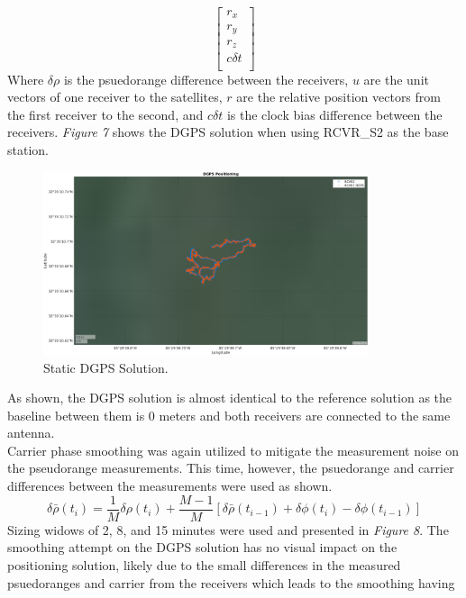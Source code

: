 \documentclass[11pt]{article}
\begin{document}
\begin{enumerate}[label=\textbf{\arabic*.}]
\begin{equation}
\begin{bmatrix}
        r_x \\ r_y \\ r_z \\ c \delta t \\
      \end{bmatrix}
    \end{equation}
    Where $\delta\rho$ is the psuedorange difference between the receivers, $u$ are 
    the unit vectors of one receiver to the satellites, $r$ are the relative position 
    vectors from the first receiver to the second, and $c \delta t$ is the clock bias 
    difference between the receivers. \emph{Figure 7} shows the DGPS solution when using 
    RCVR\_S2 as the base station.
    \begin{figure}[H]
      \centering
      \includegraphics[width=0.85\textwidth]{p2_b.png}
      \caption{Static DGPS Solution.}
    \end{figure}
    As shown, the DGPS solution is almost identical to the reference solution as the 
    baseline between them is 0 meters and both receivers are connected to the same 
    antenna.
    \\
    Carrier phase smoothing was again utilized to mitigate the measurement 
    noise on the pseudorange measurements. This time, however, the psuedorange and 
    carrier differences between the measurements were used as shown.
    \begin{equation}
      \delta\bar{\rho}(t_i) = \dfrac{1}{M} \delta\rho(t_i) + 
                              \dfrac{M-1}{M} \left[\delta\bar{\rho}(t_{i-1}) + 
                              \delta\phi(t_i) - \delta\phi(t_{i-1})\right]
    \end{equation}
    Sizing widows of 2, 8, and 15 minutes were used and presented in \emph{Figure 8}. 
    The smoothing attempt on the DGPS solution has no visual impact on the 
    positioning solution, likely due to the small differences in the measured 
    psuedoranges  and carrier from the receivers which leads to the smoothing having 

\end{enumerate}
\end{document}
